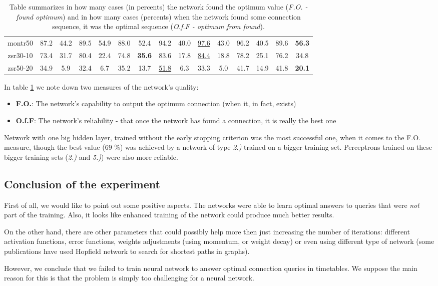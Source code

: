\begin{table}[h]
\begin{tabular}{c|c|c|c|c|c|c|c|c|c|c|c|c|c|c}
				montr50 & 87.2 & 44.2 & 89.5 & 54.9 & 88.0 & 52.4 & 94.2 & 40.0 & \underline{97.6} & 43.0 & 96.2 & 40.5 & 89.6 & \textbf{56.3} \\
				zsr30-10 & 73.4 & 31.7 & 80.4 & 22.4 & 74.8 & \textbf{35.6} & 83.6 & 17.8 & \underline{84.4} & 18.8 & 78.2 & 25.1 & 76.2 & 34.8 \\
				zsr50-20 & 34.9 & 5.9 & 32.4 & 6.7 & 35.2 & 13.7 & \underline{51.8} & 6.3 & 33.3 & 5.0 & 41.7 & 14.9 & 41.8 & \textbf{20.1} \\
        \end{tabular}
        \caption{\label{tab:resultsperc} Table summarizes in how many cases (in percents) the network found the optimum value (\textit{F.O. - found optimum}) and in how many cases (percents) when the network found some connection sequence, it was the optimal sequence (\textit{O.f.F - optimum from found}).}
        \normalsize
    \end{table}
    
    \noindent In table \ref{tab:resultsperc} we note down two measures of the network's quality:
    \begin{itemize}
    	\item \textbf{F.O.}: The network's capability to output the optimum connection (when it, in fact, exists)
    	\item \textbf{O.f.F}: The network's reliability - that once the network has found a connection, it is really the best one
    \end{itemize}
    \hspace{\fill}
    
    \noindent Network with one big hidden layer, trained without the early stopping criterion was the most successful one, when it comes to the F.O. measure, though the best value (69 \%) was achieved by a network of type \textit{2.)} trained on a bigger training set. Perceptrons trained on these bigger training sets (\textit{2.)} and \textit{5.)}) were also more reliable.
	
\subsection{Conclusion of the experiment}
	
	First of all, we would like to point out some positive aspects. The networks were able to learn optimal answers to queries that were \textit{not} part of the training. Also, it looks like enhanced training of the network could produce much better results.
	
	On the other hand, there are other parameters that could possibly help more then just increasing the number of iterations: different activation functions, error functions, weights adjustments (using momentum, or weight decay) or even using different type of network (some publications have used Hopfield network to search for shortest paths in graphs). 
	
	However, we conclude that we failed to train neural network to answer optimal connection queries in timetables. We suppose the main reason for this is that the problem is simply too challenging for a neural network.